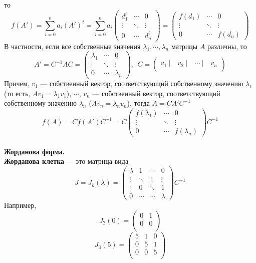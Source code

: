 \documentclass[12pt]{article}
\theoremstyle{definition}
\numberwithin{equation}{section}
\begin{document}
то \[f(A')=\sum\limits_{i=0}^n a_i(A')^i=\sum\limits_{i=0}^n a_i\begin{pmatrix}
d_1^i & \cdots & 0\\
\vdots & \ddots & \vdots\\
0 & \cdots & d_n^i
\end{pmatrix}=\begin{pmatrix}
f(d_1) & \cdots & 0\\
\vdots & \ddots & \vdots\\
0 & \cdots & f(d_n)
\end{pmatrix}\]
В частности, если все собственные значения $\lambda_1,\cdots, \lambda_n$ матрицы $A$ различны, то 
\[A'=C^{-1}AC=\begin{pmatrix}
\lambda_1 & \cdots & 0\\
\vdots & \ddots & \vdots\\
0 & \cdots & \lambda_n
\end{pmatrix},~~C= \begin{pmatrix}
v_1~| & ~v_2~| & ~\cdots~| & ~v_n\\
\end{pmatrix}\]
Причем, $v_1$ --- собственный вектор, соответствующий собственному значению $\lambda_1$ (то есть, $Av_1=\lambda_1 v_1$), $\cdots$, $v_n$ --- собственный вектор, соответствующий собственному значению $\lambda_n$ ($Av_n=\lambda_n v_n$), тогда $A=CA'C^{-1}$
\[f(A)=Cf(A')C^{-1}=C\begin{pmatrix}
f(\lambda_1) & \cdots & 0\\
\vdots & \ddots & \vdots\\
0 & \cdots & f(\lambda_n)
\end{pmatrix}C^{-1}\]
\\
\textbf{Жорданова форма.}\\
\textbf{Жорданова клетка} --- это матрица вида
\[J=J_k(\lambda)=\begin{pmatrix}
\lambda &  1 & \cdots & 0\\
\vdots & \ddots & 1 & \vdots\\
\vdots & 0 & \ddots & 1\\
0 & \cdots & \cdots & \lambda
\end{pmatrix}C^{-1}\]
Например, 
\[J_2(0) = \begin{pmatrix}
0 & 1\\
0 & 0\\
\end{pmatrix}\]
\[J_3(5) = \begin{pmatrix}
5 & 1 & 0\\
0 & 5 & 1\\
0 & 0 & 5\\
\end{pmatrix}\]
\end{document}
